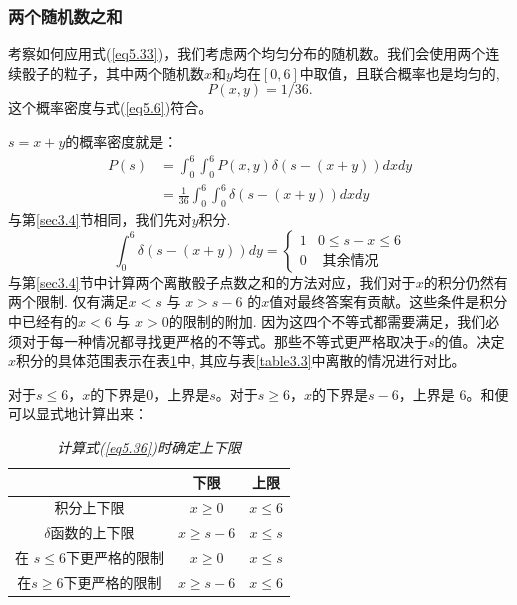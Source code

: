 \documentclass[UTF8]{ctexart}
\numberwithin{equation}{section}%
\numberwithin{figure}{section}%
\begin{document}
    \subsubsection{两个随机数之和}
    考察如何应用式(\ref{eq5.33})，我们考虑两个均匀分布的随机数。我们会使用两个连续骰子的粒子，其中两个随机数$x$和$y$均在$[0,6]$中取值，且联合概率也是均匀的,
    \begin{equation}
    P(x, y)=1 / 36 . 
    \end{equation}
    这个概率密度与式(\ref{eq5.6})符合。
    
    $s=x+y$的概率密度就是：
    \begin{equation}\label{eq5.36}
    \begin{aligned}
    P(s) &=\int_{0}^{6} \int_{0}^{6} P(x, y) \delta(s-(x+y)) d x d y \\
    &=\frac{1}{36} \int_{0}^{6} \int_{0}^{6} \delta(s-(x+y)) d x d y
    \end{aligned}
    \end{equation}
    与第\ref{sec3.4}节相同，我们先对$y$积分.
    \begin{equation}
    \int_{0}^{6} \delta(s-(x+y)) d y= \begin{cases}1 & 0 \leq s-x \leq 6 \\ 0 & \text { 其余情况 }\end{cases}
    \end{equation}
    与第\ref{sec3.4}节中计算两个离散骰子点数之和的方法对应，我们对于$x$的积分仍然有两个限制. 仅有满足$x<s$ 与 $x>s-6$ 的$x$值对最终答案有贡献。这些条件是积分中已经有的$x<6$ 与 $x>0$的限制的附加. 因为这四个不等式都需要满足，我们必须对于每一种情况都寻找更严格的不等式。那些不等式更严格取决于$s$的值。决定 $x$积分的具体范围表示在表\ref{table5.1}中, 其应与表\ref{table3.3}中离散的情况进行对比。
    
    对于$s \leq 6$，$x$的下界是0，上界是$s$。对于$s \geq 6$，$x$的下界是$s-6$，上界是 6。和便可以显式地计算出来：
    
    \begin{table}[H]
        \centering
        \caption{\textit{计算式(\ref{eq5.36})时确定上下限}}       
        \label{table5.1}
        \begin{tabular}{c|c|c}
    \hline
     & 下限 & 上限 \\
    \hline
    积分上下限 & $x \geq 0$ & $x \leq 6$ \\
    $\delta$函数的上下限 & $x \geq s-6$ & $x \leq s$ \\
    在 $s \leq 6$下更严格的限制 & $x \geq 0$ & $x \leq s$ \\
    在$s \geq 6$下更严格的限制 & $x \geq s-6$ & $x \leq 6$ \\
    \hline
    \end{tabular}
    \end{table}
\end{document}
